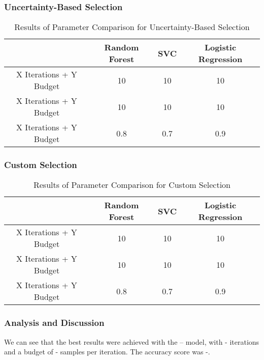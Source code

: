 \documentclass[12pt]{article}
\begin{document}
\subsubsection*{Uncertainty-Based Selection}

\begin{table}[H]
    \centering
    \begin{tabular}{|c|c|c|c|}
        \hline
        & Random Forest & SVC & Logistic Regression \\
        \hline
        X Iterations + Y Budget & 10 & 10 & 10 \\
        X Iterations + Y Budget & 10 & 10 & 10 \\
        X Iterations + Y Budget & 0.8 & 0.7 & 0.9 \\
        \hline
    \end{tabular}
    \caption{Results of Parameter Comparison for Uncertainty-Based Selection}
\end{table}


\subsubsection*{Custom Selection}

\begin{table}[H]
    \centering
    \begin{tabular}{|c|c|c|c|}
        \hline
        & Random Forest & SVC & Logistic Regression \\
        \hline
        X Iterations + Y Budget & 10 & 10 & 10 \\
        X Iterations + Y Budget & 10 & 10 & 10 \\
        X Iterations + Y Budget & 0.8 & 0.7 & 0.9 \\
        \hline
    \end{tabular}
    \caption{Results of Parameter Comparison for Custom Selection}
\end{table}

\subsubsection*{Analysis and Discussion}

We can see that the best results were achieved with the -- model, with - iterations and a budget of - samples per iteration. The accuracy score was -.


\end{document}
